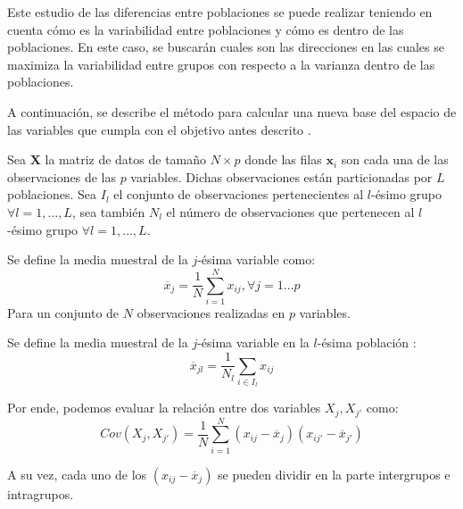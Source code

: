 \noindent Este estudio de las diferencias entre poblaciones se puede realizar teniendo en cuenta cómo es la variabilidad entre poblaciones y cómo es dentro de las poblaciones. En este caso, se buscarán  cuales son las direcciones en las cuales se maximiza la variabilidad entre grupos con respecto a la varianza dentro de las poblaciones.

\noindent A continuación, se describe el método para calcular una nueva base del espacio de las variables que cumpla con el objetivo antes descrito \cite{Johnson 2007, Lebart 1984}.

\noindent Sea $\mathbf{X}$ la matriz de datos de tamaño $N \times p$
donde las filas $\textbf{x}_i$ son cada una de las observaciones de las $p$ variables. Dichas observaciones están particionadas  por $L$ poblaciones. Sea $I_l$ el conjunto de observaciones pertenecientes al $l$-ésimo grupo $\forall l=1,\ldots, L$, sea también $N_l$ el número de observaciones que pertenecen al $l$-ésimo grupo $\forall l=1,\ldots, L$.

\begin{defi}
Se define la media muestral de la $j$-ésima variable como:
\begin{equation}
\overline{x}_j=\frac{1}{N}\sum_{i=1}^N x_{ij}, \forall j=1\ldots p
\end{equation}
Para un conjunto de $N$ observaciones realizadas en $p$ variables. 
\end{defi}

\begin{defi}
Se define la media muestral de la  $j$-ésima variable en la $l$-ésima población :
\begin{equation}
\overline{x}_{jl}=\frac{1}{N_l}\sum 
_{i\in I_l} x_{ij}
\end{equation}
\end{defi}

\noindent Por ende, podemos evaluar la relación entre dos variables $X_j, X_{j'}$ como:
\begin{equation}
Cov(X_j,X_{j'})=\dfrac{1}{N}\sum_{i=1}^N(x_{ij}-\overline{x}_j)(x_{ij'}-\overline{x}_{j'})
\end{equation}

\noindent A su vez, cada uno de los $(x_{ij}-\overline{x}_j)$ se pueden dividir en la parte intergrupos e intragrupos.


